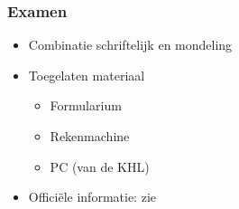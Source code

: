\documentclass[dutch]{../khlslides}
\begin{document}
\begin{frame}
  \frametitle{Examen}
  \begin{itemize}
    \item Combinatie schriftelijk en mondeling
    \item Toegelaten materiaal
          \begin{itemize}
            \item Formularium
            \item Rekenmachine
            \item PC (van de KHL)
          \end{itemize}
    \item Offici\"ele informatie: zie \href{http://onderwijsaanbod.khleuven.be/syllabi/n/MBI71AN.htm}{}
  \end{itemize}
\end{frame}
\end{document}
